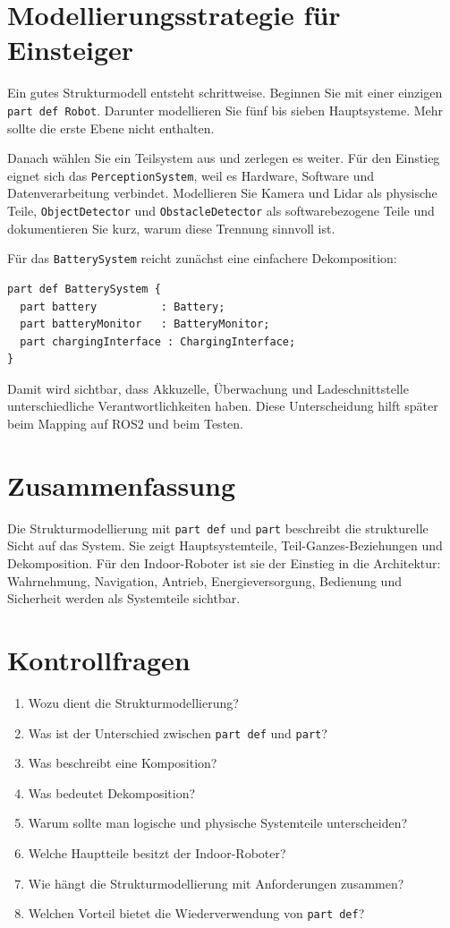 \section{Modellierungsstrategie für Einsteiger}
Ein gutes Strukturmodell entsteht schrittweise. Beginnen Sie mit einer einzigen \texttt{part def Robot}. Darunter modellieren Sie fünf bis sieben Hauptsysteme. Mehr sollte die erste Ebene nicht enthalten.

Danach wählen Sie ein Teilsystem aus und zerlegen es weiter. Für den Einstieg eignet sich das \texttt{PerceptionSystem}, weil es Hardware, Software und Datenverarbeitung verbindet. Modellieren Sie Kamera und Lidar als physische Teile, \texttt{ObjectDetector} und \texttt{ObstacleDetector} als softwarebezogene Teile und dokumentieren Sie kurz, warum diese Trennung sinnvoll ist.

Für das \texttt{BatterySystem} reicht zunächst eine einfachere Dekomposition:

\begin{lstlisting}
part def BatterySystem {
  part battery          : Battery;
  part batteryMonitor   : BatteryMonitor;
  part chargingInterface : ChargingInterface;
}
\end{lstlisting}

Damit wird sichtbar, dass Akkuzelle, Überwachung und Ladeschnittstelle unterschiedliche Verantwortlichkeiten haben. Diese Unterscheidung hilft später beim Mapping auf ROS2 und beim Testen.

\section{Zusammenfassung}
Die Strukturmodellierung mit \texttt{part def} und \texttt{part} beschreibt die strukturelle Sicht auf das System. Sie zeigt Hauptsystemteile, Teil-Ganzes-Beziehungen und Dekomposition. Für den Indoor-Roboter ist sie der Einstieg in die Architektur: Wahrnehmung, Navigation, Antrieb, Energieversorgung, Bedienung und Sicherheit werden als Systemteile sichtbar.

\section{Kontrollfragen}
\begin{enumerate}
    \item Wozu dient die Strukturmodellierung?
    \item Was ist der Unterschied zwischen \texttt{part def} und \texttt{part}?
    \item Was beschreibt eine Komposition?
    \item Was bedeutet Dekomposition?
    \item Warum sollte man logische und physische Systemteile unterscheiden?
    \item Welche Hauptteile besitzt der Indoor-Roboter?
    \item Wie hängt die Strukturmodellierung mit Anforderungen zusammen?
    \item Welchen Vorteil bietet die Wiederverwendung von \texttt{part def}?
\end{enumerate}

